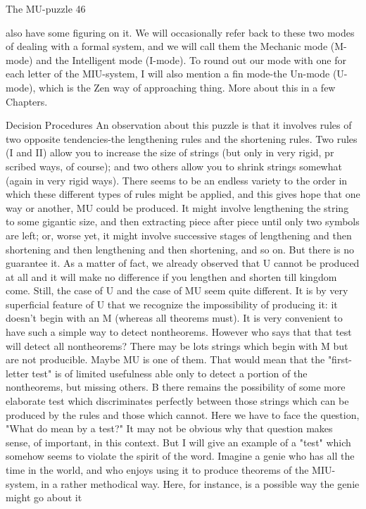 The MU-puzzle                                                                              46

also have some figuring on it. We will occasionally refer back to these two modes of
dealing with a formal system, and we will call them the Mechanic mode (M-mode) and
the Intelligent mode (I-mode). To round out our mode with one for each letter of the
MIU-system, I will also mention a fin mode-the Un-mode (U-mode), which is the Zen
way of approaching thing. More about this in a few Chapters.


                                 Decision Procedures
An observation about this puzzle is that it involves rules of two opposite tendencies-the
lengthening rules and the shortening rules. Two rules (I and II) allow you to increase the
size of strings (but only in very rigid, pr scribed ways, of course); and two others allow
you to shrink strings somewhat (again in very rigid ways). There seems to be an endless
variety to the order in which these different types of rules might be applied, and this gives
hope that one way or another, MU could be produced. It might involve lengthening the
string to some gigantic size, and then extracting piece after piece until only two symbols
are left; or, worse yet, it might involve successive stages of lengthening and then
shortening and then lengthening and then shortening, and so on. But there is no guarantee
it. As a matter of fact, we already observed that U cannot be produced at all and it will
make no difference if you lengthen and shorten till kingdom come.
        Still, the case of U and the case of MU seem quite different. It is by very
superficial feature of U that we recognize the impossibility of producing it: it doesn't
begin with an M (whereas all theorems must). It is very convenient to have such a simple
way to detect nontheorems. However who says that that test will detect all nontheorems?
There may be lots strings which begin with M but are not producible. Maybe MU is one
of them. That would mean that the "first-letter test" is of limited usefulness able only to
detect a portion of the nontheorems, but missing others. B there remains the possibility of
some more elaborate test which discriminates perfectly between those strings which can
be produced by the rules and those which cannot. Here we have to face the question,
"What do mean by a test?" It may not be obvious why that question makes sense, of
important, in this context. But I will give an example of a "test" which somehow seems to
violate the spirit of the word.
        Imagine a genie who has all the time in the world, and who enjoys using it to
produce theorems of the MIU-system, in a rather methodical way. Here, for instance, is a
possible way the genie might go about it

